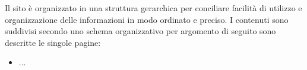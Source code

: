Il sito è organizzato in una struttura gerarchica per conciliare facilità di
utilizzo e organizzazione delle informazioni in modo ordinato e preciso. I
contenuti sono suddivisi secondo uno schema organizzativo per argomento di
seguito sono descritte le singole pagine:

\begin{itemize}
	\item ...
\end{itemize}
